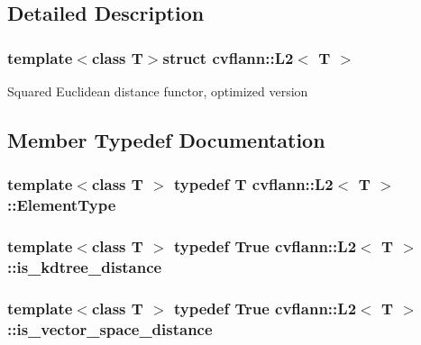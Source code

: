 \subsection{Detailed Description}
\subsubsection*{template$<$class T$>$struct cvflann\-::\-L2$<$ T $>$}

Squared Euclidean distance functor, optimized version 

\subsection{Member Typedef Documentation}
\hypertarget{structcvflann_1_1L2_a947248fbf703551189651b69d75435db}{
\subsubsection[{Element\-Type}]{\setlength{\rightskip}{0pt plus 5cm}template$<$class T $>$ typedef {\bf T} {\bf cvflann\-::\-L2}$<$ {\bf T} $>$\-::{\bf Element\-Type}}}\label{structcvflann_1_1L2_a947248fbf703551189651b69d75435db}
\hypertarget{structcvflann_1_1L2_a3da7a47efd79776d2eff26fcd3b6d3b1}{
\subsubsection[{is\-\_\-kdtree\-\_\-distance}]{\setlength{\rightskip}{0pt plus 5cm}template$<$class T $>$ typedef {\bf True} {\bf cvflann\-::\-L2}$<$ {\bf T} $>$\-::{\bf is\-\_\-kdtree\-\_\-distance}}}\label{structcvflann_1_1L2_a3da7a47efd79776d2eff26fcd3b6d3b1}
\hypertarget{structcvflann_1_1L2_aaab92e6462f69adb45b3822b922a232d}{
\subsubsection[{is\-\_\-vector\-\_\-space\-\_\-distance}]{\setlength{\rightskip}{0pt plus 5cm}template$<$class T $>$ typedef {\bf True} {\bf cvflann\-::\-L2}$<$ {\bf T} $>$\-::{\bf is\-\_\-vector\-\_\-space\-\_\-distance}}}\label{structcvflann_1_1L2_aaab92e6462f69adb45b3822b922a232d}
